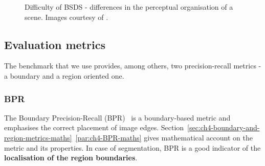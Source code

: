 \begin{figure}[ht!]
\centering
\caption[Difficulty of BSDS - differences in the perceptual organisation of a scene]{Difficulty of BSDS - differences in the perceptual organisation of a scene. Images courtesy of \cite{Li2013SemanticBenchmark}.}
\label{fig:BSDS-perceptual}
\end{figure}

\subsection{Evaluation metrics}
The benchmark that we use provides, among others, two precision-recall metrics - a boundary and a region oriented one.

\subsubsection{BPR}
The Boundary Precision-Recall (BPR)~\cite{Arbelaez11} is a boundary-based metric and emphasises the correct placement of image edges. Section~\ref*{sec:ch4-boundary-and-region-metrics-maths}~\ref{par:ch4-BPR-maths} %
gives mathematical account on the metric and its properties. In case of segmentation, BPR is a good indicator of the {\bf localisation of the region boundaries}.

